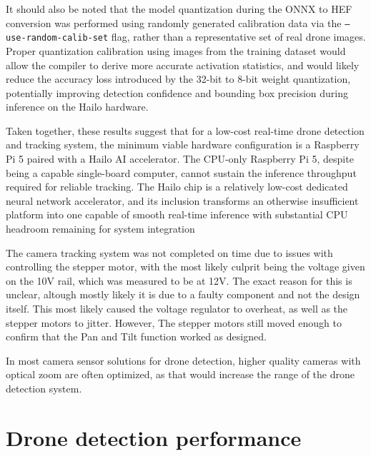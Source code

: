 \vspace{1em}

It should also be noted that the model quantization during the ONNX 
to HEF conversion was performed using randomly generated calibration 
data via the \texttt{--use-random-calib-set} flag, rather than a 
representative set of real drone images. Proper quantization 
calibration using images from the training dataset would allow the 
compiler to derive more accurate activation statistics, and would 
likely reduce the accuracy loss introduced by the 32-bit to 8-bit 
weight quantization, potentially improving detection confidence 
and bounding box precision during inference on the Hailo hardware.

 \vspace{1em}

 Taken together, these results suggest that for a low-cost real-time drone detection and tracking system, the minimum viable hardware configuration is a Raspberry Pi 5 paired with a Hailo AI accelerator. The CPU-only Raspberry Pi 5, despite being a capable single-board computer, cannot sustain the inference throughput required for reliable tracking. The Hailo chip is a relatively low-cost dedicated neural network accelerator, and its inclusion transforms an otherwise insufficient platform into one capable of smooth real-time inference with substantial CPU headroom remaining for system integration
 
  \vspace{1em}
  
The camera tracking system was not completed on time due to issues with controlling the stepper motor, with the most likely culprit being the voltage given on the 10V rail, which was measured to be at 12V. The exact reason for this is unclear, altough mostly likely it is due to a faulty component and not the design itself. This most likely caused the voltage regulator to overheat, as well as the stepper motors to jitter. However, The stepper motors still moved enough to confirm that the Pan and Tilt function worked as designed.

In most camera sensor solutions for drone detection, higher quality cameras with optical zoom are often optimized, as that would increase the range of the drone detection system. 



\section{Drone detection performance}

